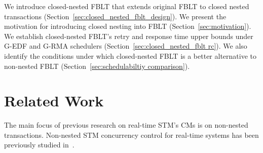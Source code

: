 \documentclass[10pt, conference, compsocconf]{IEEEtran}
\begin{document}
We introduce closed-nested FBLT that extends original FBLT to closed nested transactions (Section~\ref{sec:closed_nested_fblt_design}). We present the motivation for introducing closed nesting into FBLT (Section~\ref{sec:motivation}). We establish closed-nested FBLT's retry and response time upper bounds under G-EDF and G-RMA schedulers (Section~\ref{sec:closed_nested_fblt rc}). We also identify the conditions under which closed-nested FBLT is a better alternative to non-nested FBLT (Section~\ref{sec:schedulabiltiy comparison}). 
%
\begin{comment}
We implement FBLT and competitor CM techniques in the Rochester STM framework~\cite{marathe2006lowering} and conduct experimental studies (Section~\ref{exp_eval}). Our results reveal that FBLT has shorter retry cost than ECM, RCM, LCM and lock-free. FBLT's retry cost is comparable to that of PNF, especially in case of non-transitive retry, but it doesn't require a-priori knowledge of objects accessed by transactions, unlike PNF. 

Thus, the paper's contribution is the FBLT contention manager with superior timeliness properties. FBLT, thus allows programmers to reap STM's significant programmability and composability benefits for a broader range of multicore embedded real-time software than what was previously possible.
\end{comment}

\section{Related Work}
\label{sec:past}

\begin{comment}
Transactional-like concurrency control without using locks, for real-time systems, has been previously studied in the context of non-blocking data structures (e.g.,~\cite{anderson95realtime}). Despite their numerous advantages over locks 
(e.g., deadlock-freedom), 
their programmability has remained a challenge. 
Past studies show that they are best suited for simple data structures where their retry cost is competitive to the cost of lock-based synchronization~\cite{bc+08}.  In contrast, STM is semantically simpler~\cite{Herlihy:2006:AMP:1146381.1146382}, and is often the only viable lock-free solution for complex data structures (e.g., red/black tree)~\cite{key-1} and nested critical sections~\cite{Saha:2006:MHP:1122971.1123001}.
\end{comment}

The main focus of previous research on real-time STM's CMs is on non-nested transactions. Non-nested STM concurrency control for real-time systems has been previously studied in~\cite{manson2006preemptible,fahmy2009bounding,sarni2009real,schoeberl2010rttm,key-1,barrosmanaging,stmconcurrencycontrol:emsoft11,lcmdac2012,pnf_dac_asp,fblt}.
\end{document}
